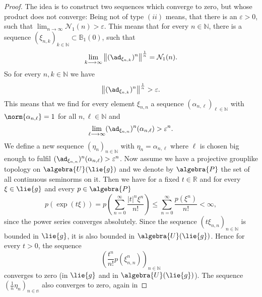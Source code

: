 \documentclass[
11pt,                          %
english                        %
]{article}
\begin{document}
\begin{proof}
	The idea is to construct two sequences which converge to zero, but whose 
	product does not converge: Being not of type $(ii)$ means, that there is an
	$\varepsilon > 0$, such that $\lim_{n \rightarrow \infty} \mathcal{N}_1(n) > 
	\varepsilon$. This means that for every $n \in \mathbb{N}$, there is a sequence 
	$\left(\xi_{n, k} \right)_{k \in \mathbb{N}} \subset \mathbb{B}_1(0)$, 
	such that
	\begin{equation*}
		\lim_{k \longrightarrow \infty}
		\left\Vert
			(\ad_{\xi_{n, k}})^n
		\right\Vert^{\frac{1}{n}}
		=
		\mathcal{N}_1(n).
	\end{equation*}
	So for every $n, k \in \mathbb{N}$ we have
	\begin{equation*}
		\left\Vert
			(\ad_{\xi_{n, k}})^n
		\right\Vert^{\frac{1}{n}}
		> \varepsilon.
	\end{equation*}
	This means that we find for every element $\xi_{n,n}$ a sequence 
	$(\alpha_{n, \ell})_{\ell \in \mathbb{N}}$ with $\norm{\alpha_{n, \ell}} = 1$ 
	for all $n, \ell \in \mathbb{N}$ and
	\begin{equation*}
		\lim_{\ell \longrightarrow \infty}
		(\ad_{\xi_{n,n}})^n(\alpha_{n,\ell})
		> 
		\varepsilon^n.
	\end{equation*}
	We define a new sequence $(\eta_n)_{n \in \mathbb{N}}$ with 
	$\eta_n = \alpha_{n, \ell}$ where $\ell$ is chosen big enough to 
	fulfil $(\ad_{\xi_{n,n}})^n(\alpha_{n,\ell}) > \varepsilon^n$.
	Now assume we have a projective grouplike topology on $\algebra{U}(\lie{g})$ 
	and we denote by $\algebra{P}$ the set of all continuous seminorms on it. 
	Then we have for a fixed $t \in \mathbb{R}$ and for every $\xi \in \lie{g}$ 
	and every $p \in \algebra{P}$
	\begin{equation*}
		p \left( \exp(t \xi) \right)
		=
		p \left(
			\sum\limits_{n=0}^\infty
			\frac{|t|^n \xi^n}{n!}
		\right)
		\leq
		\sum\limits_{n=0}^\infty
		\frac{p\left( \xi^n \right)}{n!}
		<
		\infty,
	\end{equation*}
	since the power series converges absolutely. Since the sequence 
	$(t \xi_{n,n})_{n \in \mathbb{N}}$ is bounded in $\lie{g}$, it is also bounded 
	in $\algebra{U}(\lie{g})$. Hence for every $t > 0$, the sequence
	\begin{equation*}
		\left(
			\frac{t^n}{n!}
			p\left(
				\xi_{n,n}^n
			\right)
		\right)_{n \in \mathbb{N}}
	\end{equation*}
	converges to zero (in $\lie{g}$ and in $\algebra{U}(\lie{g})$). The sequence 
	$(\frac{1}{n} \eta_n)_{n \in \mathbb{n}}$ also converges to zero, again in 

\end{proof}
\end{document}
